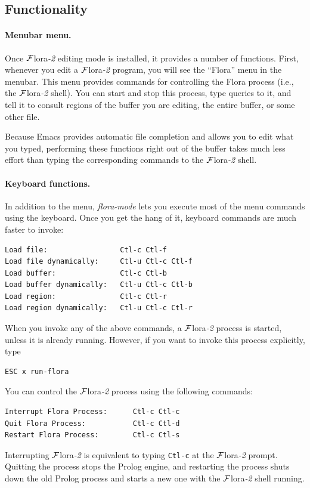 \documentclass[11pt]{article}
\newcommand{\FLORA}{{\mbox{\sc ${\cal F}${lora}\rm\emph{-2}}}\xspace}
\begin{document}
\subsection{Functionality}


\paragraph{Menubar menu.}
Once \FLORA editing mode is installed, it provides a number of functions.
First, whenever you edit a \FLORA program, you will see the ``Flora'' menu
in the menubar. This menu provides commands for controlling the Flora
process (i.e., the \FLORA shell). You can start and stop
this process, type queries to it, and tell it to consult regions of
the buffer you are editing, the entire buffer, or some other file.

Because Emacs provides automatic file completion and allows you to edit
what you typed, performing these functions right out of the buffer takes
much less effort than typing the corresponding commands to the \FLORA
shell.

\paragraph{Keyboard functions.}
In addition to the menu, \emph{flora-mode} lets you execute most of the
menu commands using the keyboard. Once you get the hang of it, keyboard
commands are much faster to invoke:
\begin{verbatim}
Load file:                 Ctl-c Ctl-f
Load file dynamically:     Ctl-u Ctl-c Ctl-f
Load buffer:               Ctl-c Ctl-b
Load buffer dynamically:   Ctl-u Ctl-c Ctl-b
Load region:               Ctl-c Ctl-r
Load region dynamically:   Ctl-u Ctl-c Ctl-r
\end{verbatim}
When you invoke any of the above commands, a \FLORA process is started,
unless it is already running. However, if you want to invoke this process
explicitly, type
\begin{verbatim}
ESC x run-flora  
\end{verbatim}
You can control the \FLORA process using the following commands:
\begin{verbatim}
Interrupt Flora Process:      Ctl-c Ctl-c
Quit Flora Process:           Ctl-c Ctl-d
Restart Flora Process:        Ctl-c Ctl-s
\end{verbatim}
Interrupting \FLORA is equivalent to typing {\tt Ctl-c} at the \FLORA
prompt. Quitting the process stops the Prolog engine, and restarting the
process shuts down the old Prolog process and starts a new one with the \FLORA
shell running. 
\end{document}
